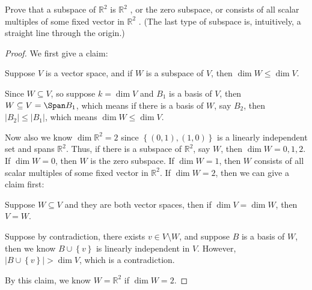 \begin{problem}
Prove that a subspace of \(\mathbb{R} ^2\)  is \(\mathbb{R} ^2\) , or the zero subspace, or consists of all
scalar multiples of some fixed vector in \(\mathbb{R} ^2\) . (The last type of subspace is, intuitively, a straight line through the origin.)
\end{problem}
\begin{proof}
    We first give a claim: 
    \begin{claim}
        Suppose \(V\) is a vector space, and if \(W\) is a subspace of \(V\), then \(\dim W \le \dim V\).  
    \end{claim}
    \begin{explanation}
        Since \(W \subseteq V\), so suppose \(k=\dim V\) and \(B_1\) is a basis of \(V\), then \(W \subseteq V = \Span B_1\), which means if there is a basis of \(W\), say \(B_2\), then \(\vert B_2 \vert \le \vert B_1 \vert\), which means \(\dim W \le \dim V\).         
    \end{explanation}

    Now also we know \(\dim \mathbb{R} ^2 = 2\) since \(\left\{ (0,1), (1, 0) \right\} \) is a linearly independent set and spans \(\mathbb{R} ^2\). Thus, if there is a subspace of \(\mathbb{R} ^2\), say \(W\), then \(\dim W = 0, 1, 2\). If \(\dim W = 0\), then \(W\) is the zero subspace. If \(\dim W = 1\), then \(W\) consists of all scalar multiples of some fixed vector in \(\mathbb{R} ^2\). If \(\dim W = 2\), then we can give a claim first: 
    \begin{claim}
        Suppose \(W \subseteq V\) and they are both vector spaces, then if \(\dim V = \dim W\), then \(V = W\).  
    \end{claim}        
    \begin{explanation}
        Suppose by contradiction, there exists \(v \in V \setminus W\), and suppose \(B\) is a basis of \(W\), then we know \(B \cup \left\{ v \right\} \) is linearly independent in \(V\). However, \(\left\vert B \cup \left\{ v \right\}  \right\vert > \dim V \), which is a contradiction.      
    \end{explanation}  
    By this claim, we know \(W = \mathbb{R} ^2\) if \(\dim W = 2\).    
\end{proof}
